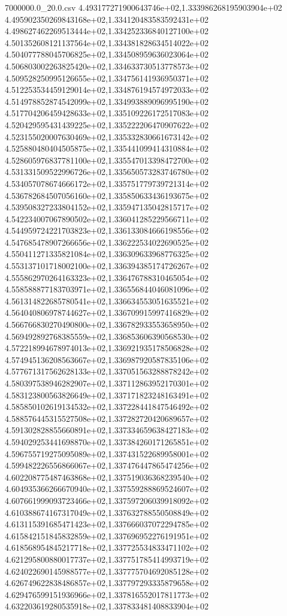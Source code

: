 \begin{filecontents*}{7000000.0_20.0.csv}
4.493177271900643746e+02,1.333986268195903904e+02
4.495902350269843168e+02,1.334120483583592431e+02
4.498627462269513444e+02,1.334252336840127100e+02
4.501352608121137564e+02,1.334381828634514022e+02
4.504077788045706825e+02,1.334508959636023064e+02
4.506803002263825420e+02,1.334633730513778573e+02
4.509528250995126655e+02,1.334756141936950371e+02
4.512253534459129014e+02,1.334876194574972033e+02
4.514978852874542099e+02,1.334993889096995190e+02
4.517704206459428633e+02,1.335109226172517083e+02
4.520429595431439225e+02,1.335222206470907622e+02
4.523155020007630469e+02,1.335332830661673142e+02
4.525880480404505875e+02,1.335441099414310884e+02
4.528605976837781100e+02,1.335547013398472700e+02
4.531331509522996726e+02,1.335650573283746780e+02
4.534057078674666172e+02,1.335751779739721314e+02
4.536782684507056160e+02,1.335850633436193675e+02
4.539508327233804152e+02,1.335947135042815717e+02
4.542234007067890502e+02,1.336041285229566711e+02
4.544959724221703823e+02,1.336133084666198556e+02
4.547685478907266656e+02,1.336222534022690525e+02
4.550411271335821084e+02,1.336309633968776325e+02
4.553137101718002100e+02,1.336394385174726267e+02
4.555862970264163323e+02,1.336476788310465054e+02
4.558588877183703971e+02,1.336556844046081096e+02
4.561314822685780541e+02,1.336634553051635521e+02
4.564040806978744627e+02,1.336709915997416829e+02
4.566766830270490800e+02,1.336782933553658950e+02
4.569492892768385559e+02,1.336853606390568530e+02
4.572218994678974013e+02,1.336921935178506828e+02
4.574945136208563667e+02,1.336987920587835106e+02
4.577671317562628133e+02,1.337051563288878242e+02
4.580397538946282907e+02,1.337112863952170301e+02
4.583123800563826649e+02,1.337171823248163491e+02
4.585850102619134532e+02,1.337228441847546492e+02
4.588576445315527508e+02,1.337282720420689657e+02
4.591302828855660891e+02,1.337334659638427183e+02
4.594029253441698870e+02,1.337384260171265851e+02
4.596755719275095089e+02,1.337431522689958001e+02
4.599482226556866067e+02,1.337476447865474256e+02
4.602208775487463868e+02,1.337519036368239540e+02
4.604935366266670940e+02,1.337559288869524607e+02
4.607661999093723466e+02,1.337597206039918092e+02
4.610388674167317049e+02,1.337632788550508849e+02
4.613115391685471423e+02,1.337666037072294785e+02
4.615842151845832859e+02,1.337696952276191951e+02
4.618568954845217718e+02,1.337725534833471102e+02
4.621295800880017737e+02,1.337751785414993719e+02
4.624022690145988577e+02,1.337775704692085128e+02
4.626749622838486857e+02,1.337797293335879658e+02
4.629476599151936966e+02,1.337816552017811773e+02
4.632203619280535918e+02,1.337833481408833904e+02

\end{filecontents*}
